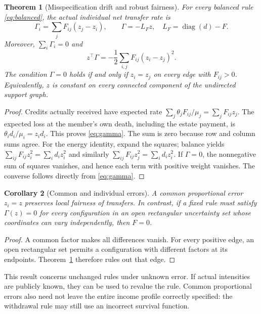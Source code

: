 \documentclass[11pt,a4paper]{article}
\newtheorem{theorem}{Theorem}[section]
\newtheorem{corollary}[theorem]{Corollary}
\theoremstyle{definition}\newtheorem{definition}[theorem]{Definition}
\theoremstyle{remark}\newtheorem{remark}[theorem]{Remark}
\newcommand{\diag}{\operatorname{diag}}
\begin{document}
\begin{theorem}[Misspecification drift and robust fairness]\label{thm:laplacian}
For every balanced rule \eqref{eq:balanced}, the actual individual net transfer rate is
\begin{equation}\label{eq:gamma}
\Gamma_i=\sum_jF_{ij}(z_j-z_i),
\qquad \Gamma=-L_Fz,\quad L_F=\diag(d)-F.
\end{equation}
Moreover, $\sum_i\Gamma_i=0$ and
\begin{equation}\label{eq:energy}
z^\top\Gamma=-\frac12\sum_{i,j}F_{ij}(z_i-z_j)^2.
\end{equation}
The condition $\Gamma=0$ holds if and only if $z_i=z_j$ on every edge with $F_{ij}>0$. Equivalently, $z$ is constant on every connected component of the undirected support graph.
\end{theorem}
\begin{proof}
Credits actually received have expected rate $\sum_j\theta_jF_{ij}/\mu_j=\sum_jF_{ij}z_j$. The expected loss at the member's own death, including the estate payment, is $\theta_i d_i/\mu_i=z_id_i$. This proves \eqref{eq:gamma}. The sum is zero because row and column sums agree. For the energy identity, expand the squares; balance yields $\sum_{ij}F_{ij}z_i^2=\sum_i d_i z_i^2$ and similarly $\sum_{ij}F_{ij}z_j^2=\sum_i d_i z_i^2$. If $\Gamma=0$, the nonnegative sum of squares vanishes, and hence each term with positive weight vanishes. The converse follows directly from \eqref{eq:gamma}.
\end{proof}

\begin{corollary}[Common and individual errors]\label{cor:impossibility}
A common proportional error $z_i=z$ preserves local fairness of transfers. In contrast, if a fixed rule must satisfy $\Gamma(z)=0$ for every configuration in an open rectangular uncertainty set whose coordinates can vary independently, then $F=0$.
\end{corollary}
\begin{proof}
A common factor makes all differences vanish. For every positive edge, an open rectangular set permits a configuration with different factors at its endpoints. Theorem~\ref{thm:laplacian} therefore rules out that edge.
\end{proof}

This result concerns unchanged rules under unknown error. If actual intensities are publicly known, they can be used to revalue the rule. Common proportional errors also need not leave the entire income profile correctly specified: the withdrawal rule may still use an incorrect survival function.
\end{document}
